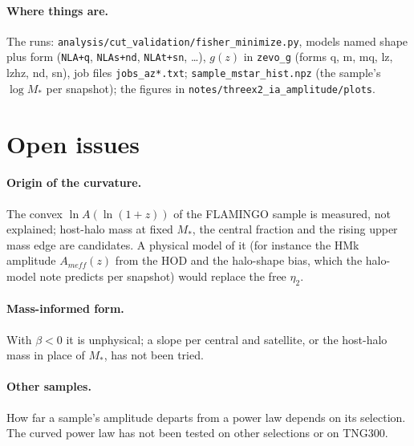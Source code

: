 \documentclass[11pt]{article}
\begin{document}
\paragraph{Where things are.} The runs:
\texttt{analysis/cut\_validation/fisher\_minimize.py}, models named shape
plus form (\texttt{NLA+q}, \texttt{NLAs+nd}, \texttt{NLAt+sn}, \ldots), $g(z)$
in \texttt{zevo\_g} (forms q, m, mq, lz, lzhz, nd, sn), job files
\texttt{jobs\_az*.txt};
\texttt{sample\_mstar\_hist.npz} (the sample's $\log M_*$ per snapshot); the
figures in \texttt{notes/threex2\_ia\_amplitude/plots}.

\section{Open issues}

\paragraph{Origin of the curvature.} The convex $\ln A(\ln(1+z))$ of the
FLAMINGO sample is measured, not explained; host-halo mass at fixed
$M_*$, the central fraction and the rising upper mass edge are candidates.
A physical model of it (for instance the HMk amplitude $A_{
m eff}(z)$ from the
HOD and the halo-shape bias, which the halo-model note predicts per
snapshot) would replace the free $\eta_2$.

\paragraph{Mass-informed form.} With $\beta<0$ it is unphysical; a slope
per central and satellite, or the host-halo mass in place of $M_*$, has
not been tried.

\paragraph{Other samples.} How far a sample's amplitude departs from a
power law depends on its selection. The curved power law has not been
tested on other selections or on TNG300.
\end{document}
